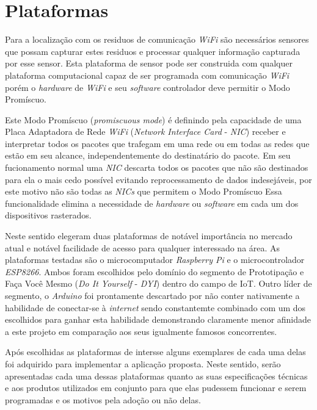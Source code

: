 \chapter{Plataformas}
\label{chap:Plataformas}

Para a localização com os residuos de comunicação \emph{WiFi} são necessários
sensores que possam capturar estes residuos e processar qualquer informação
capturada por esse sensor. Esta plataforma de sensor pode ser construida com
qualquer plataforma computacional capaz de ser programada com comunicação
\emph{WiFi} porém o \emph{hardware} de \emph{WiFi} e seu \emph{software}
controlador deve permitir o Modo Promíscuo.

Este Modo Promíscuo (\emph{promiscuous mode}) é definindo pela capacidade de uma
Placa Adaptadora de Rede \emph{WiFi} (\emph{Network Interface Card} -
\emph{NIC}) receber e interpretar todos os pacotes que trafegam em uma rede ou
em todas as redes que estão em seu alcance, independentemente do destinatário do
pacote. Em seu fucionamento normal uma \emph{NIC} descarta todos os pacotes que
não são destinados para ela o mais cedo possível evitando reprocessamento de
dados indesejáveis, por este motivo não são todas as \emph{NICs} que permitem o
Modo Promíscuo Essa funcionalidade elimina a necessidade de \emph{hardware} ou
\emph{software} em cada um dos dispositivos rasterados.

Neste sentido elegeram duas plataformas de notável importância no mercado atual
e notável facilidade de acesso para qualquer interessado na área. As plataformas
testadas são o microcomputador \emph{Raspberry Pi} e o microcontrolador
\emph{ESP8266}. Ambos  foram escolhidos pelo domínio do segmento de Prototipação
e Faça Você Mesmo  (\emph{Do It Yourself} - \emph{DYI}) dentro do campo de IoT.
Outro líder de segmento, o \emph{Arduino}  foi prontamente descartado por não
conter nativamente a habilidade de conectar-se à \emph{internet} sendo
constantemte combinado com um dos escolhidos para ganhar esta habilidade
demonstrando claramente menor afinidade a este projeto em comparação aos seus
igualmente famosos concorrentes.

Após escolhidas as plataformas de intersse alguns exemplares de cada uma delas
foi adquirido para implementar a aplicação proposta. Neste sentido, serão
apresentadas cada uma dessas plataformas quanto as suas especificações técnicas
e aos produtos utilizados em conjunto para que elas pudessem funcionar e serem
programadas e os motivos pela adoção ou não delas.


